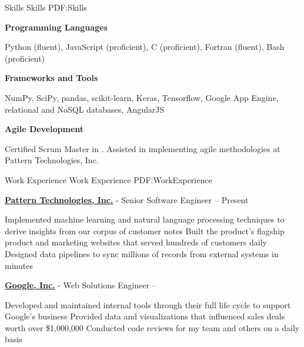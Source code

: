\documentclass[letterpaper,MMMyyyy,nonstopmode]{simpleresumecv}
\begin{document}
\begin{Body}


\Section
{Skills}
{Skills}
{PDF:Skills}

\Entry
\textbf{Programming Languages}
\begin{Detail}
\Item Python (fluent), JavaScript (proficient), C (proficient), Fortran (fluent), Bash (proficient)
\end{Detail}

\BigGap
\Entry
\textbf{Frameworks and Tools}
\begin{Detail}
\Item NumPy, SciPy, pandas, scikit-learn, Keras, Tensorflow, Google App Engine, relational and NoSQL databases, AngularJS
\end{Detail}

\BigGap
\Entry
\textbf{Agile Development}
\begin{Detail}
\Item Certified Scrum Master in .  Assisted in implementing agile methodologies at Pattern Technologies, Inc.
\end{Detail}


\Section
{Work Experience}
{Work Experience}
{PDF:WorkExperience}

\Entry
\href {https://getpattern.com}{\textbf{Pattern Technologies, Inc.}}
-
Senior Software Engineer
\hfill
{} -- Present

\Gap
\begin{Detail}
\BulletItem
Implemented machine learning and natural language processing techniques to derive insights from our corpus of customer notes
\BulletItem
Built the product's flagship product and
marketing websites that served hundreds of customers daily
\BulletItem
Designed data pipelines to sync millions of records from external systems in minutes
\end{Detail}


\BigGap
\Entry
\href {https://google.com}{\textbf{Google, Inc.}}
-
Web Solutions Engineer
\hfill
{} -- 

\Gap
\begin{Detail}
\BulletItem
Developed and maintained internal tools through their full life cycle to support Google's business
\BulletItem
Provided data and visualizations that influenced sales deals worth over \$1,000,000
\BulletItem
Conducted code reviews for my team and others on a daily basis
\end{Detail}



\end{Body}
\end{document}
